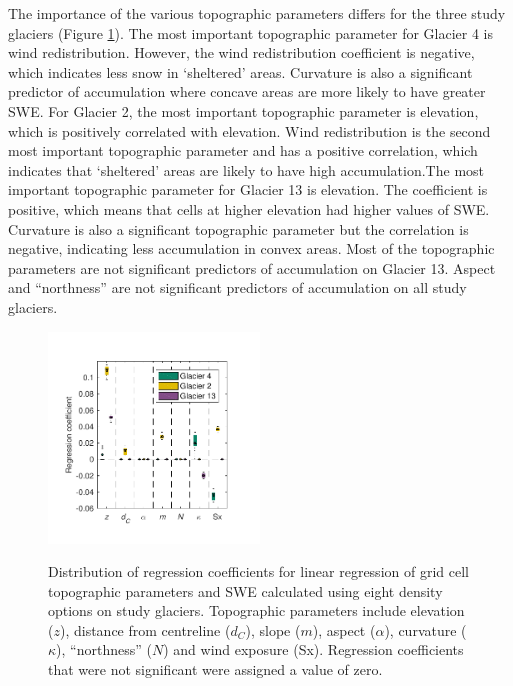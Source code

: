\documentclass[twocolumn,letterpaper]{igs}
\begin{document}
The importance of the various topographic parameters differs for the three study glaciers (Figure \ref{fig:BetaCoeffs}). The most important topographic parameter for Glacier 4 is wind redistribution. However, the wind redistribution coefficient is negative, which indicates less snow in `sheltered' areas. Curvature is also a significant predictor of accumulation where concave areas are more likely to have greater SWE. For Glacier 2, the most important topographic parameter is elevation, which is positively correlated with elevation. Wind redistribution is the second most important topographic parameter and has a positive correlation, which indicates that `sheltered' areas are likely to have high accumulation.The most important topographic parameter for Glacier 13 is elevation. The coefficient is positive, which means that cells at higher elevation had higher values of SWE. Curvature is also a significant topographic parameter but the correlation is negative, indicating less accumulation in convex areas. Most of the topographic parameters are not significant predictors of accumulation on Glacier 13. Aspect and ``northness'' are not significant predictors of accumulation on all study glaciers.

\begin{figure}
	\centering
	\includegraphics[width =0.5\textwidth]{BetaCoeffs.pdf}\\
	\caption{Distribution of regression coefficients for linear regression of grid cell topographic parameters and SWE calculated using eight density options on study glaciers. Topographic parameters include elevation ($z$), distance from centreline ($d_C$), slope ($m$), aspect ($\alpha$), curvature ($\kappa$), ``northness'' ($N$) and wind exposure (Sx). Regression coefficients that were not significant were assigned a value of zero.}
	\label{fig:BetaCoeffs}
\end{figure}
\end{document}
